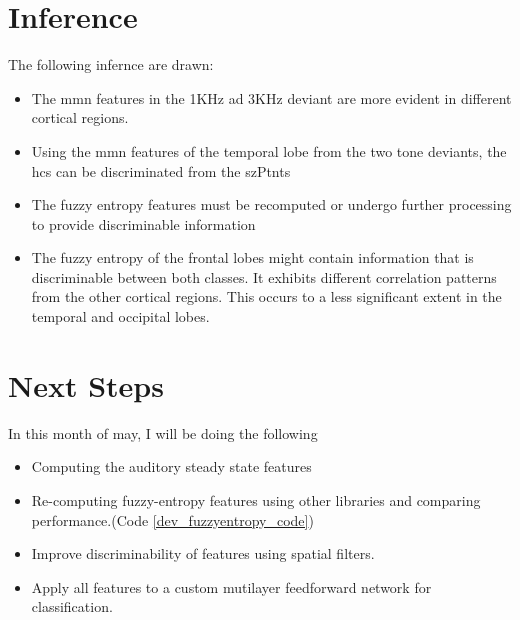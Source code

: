\documentclass[10pt]{article}
\begin{document}
\section{Inference}
The following infernce are drawn:
\begin{itemize}
  \item The \gls{mmn} features in the 1KHz ad 3KHz deviant are more 
  evident in different cortical regions. 
  \item Using the \gls{mmn} features of the temporal lobe 
  from the two tone deviants, the \glspl{hc} can be discriminated 
  from the \glspl{szPtnt}
  \item The fuzzy entropy features must be recomputed or undergo 
  further processing to provide discriminable information
  \item The fuzzy entropy of the frontal lobes might contain information 
  that is discriminable between both classes. It exhibits different 
  correlation patterns from the other cortical regions. This occurs to 
  a less significant extent in the temporal and occipital lobes.
\end{itemize}

\section{Next Steps}
In this month of may, I will be doing the following
\begin{itemize}
  \item Computing the auditory steady state features
  \item Re-computing fuzzy-entropy features using other libraries and 
  comparing performance.(Code \ref{dev_fuzzyentropy_code})
  \item Improve discriminability of features using spatial filters.
  \item Apply all features to a custom mutilayer feedforward network 
  for classification.
\end{itemize}

\clearpage
\end{document}
